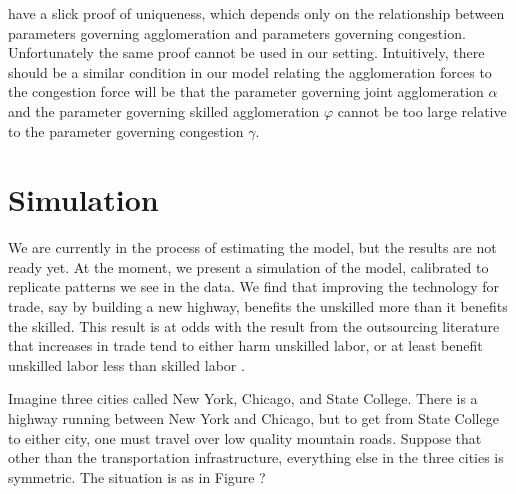 \documentclass[12 pt]{article}
\begin{document}
\citet{allen2014trade} have a slick proof of uniqueness, which depends only on the relationship between parameters governing agglomeration and parameters governing congestion.  Unfortunately the same proof cannot be used in our setting.  Intuitively, there should be a similar condition in our model relating the agglomeration forces to the congestion force will be that the parameter governing joint agglomeration $\alpha$ and the parameter governing skilled agglomeration $\varphi$ cannot be too large relative to the parameter governing congestion $\gamma$.  

\section{Simulation}

We are currently in the process of estimating the model, but the results are not ready yet.  At the moment, we present a simulation of the model, calibrated to replicate patterns we see in the data.  We find that improving the technology for trade, say by building a new highway, benefits the unskilled more than it benefits the skilled.  This result is at odds with the result from the outsourcing literature that increases in trade tend to either harm unskilled labor, or at least benefit unskilled labor less than skilled labor \citep{hummels2014wage}.

Imagine three cities called New York, Chicago, and State College.  There is a highway running between New York and Chicago, but to get from State College to either city, one must travel over low quality mountain roads.  Suppose that other than the transportation infrastructure, everything else in the three cities is symmetric.  The situation is as in Figure ? 
\end{document}
